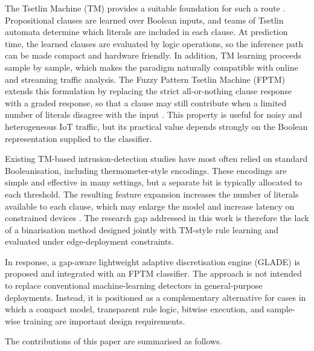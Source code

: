 \documentclass[journal,twoside,web]{ieeecolor}
\begin{document}
The Tsetlin Machine (TM) provides a suitable foundation for such a route \cite{granmo2018tsetlin}. Propositional clauses are learned over Boolean inputs, and teams of Tsetlin automata determine which literals are included in each clause. At prediction time, the learned clauses are evaluated by logic operations, so the inference path can be made compact and hardware friendly. In addition, TM learning proceeds sample by sample, which makes the paradigm naturally compatible with online and streaming traffic analysis. The Fuzzy Pattern Tsetlin Machine (FPTM) extends this formulation by replacing the strict all-or-nothing clause response with a graded response, so that a clause may still contribute when a limited number of literals disagree with the input \cite{hnilov2025fptm}. This property is useful for noisy and heterogeneous IoT traffic, but its practical value depends strongly on the Boolean representation supplied to the classifier.

Existing TM-based intrusion-detection studies have most often relied on standard Booleanisation, including thermometer-style encodings. These encodings are simple and effective in many settings, but a separate bit is typically allocated to each threshold. The resulting feature expansion increases the number of literals available to each clause, which may enlarge the model and increase latency on constrained devices \cite{nguyen2025binarized}. The research gap addressed in this work is therefore the lack of a binarisation method designed jointly with TM-style rule learning and evaluated under edge-deployment constraints.

In response, a gap-aware lightweight adaptive discretisation engine (GLADE) is proposed and integrated with an FPTM classifier. The approach is not intended to replace conventional machine-learning detectors in general-purpose deployments. Instead, it is positioned as a complementary alternative for cases in which a compact model, transparent rule logic, bitwise execution, and sample-wise training are important design requirements.

The contributions of this paper are summarised as follows.
\end{document}
